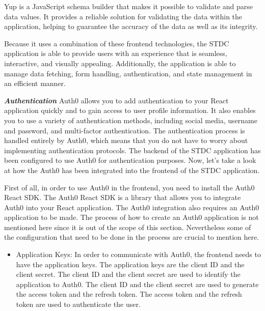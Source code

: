\begin{justify}
        \vspace{0.25cm}
        \newendline Yup is a JavaScript schema builder that makes it possible to validate and parse data values. It provides a reliable solution for validating the data within the application, helping to guarantee the accuracy of the data as well as its integrity.
        
        \vspace{0.25cm}
        \newendline Because it uses a combination of these frontend technologies, the STDC application is able to provide users with an experience that is seamless, interactive, and visually appealing. Additionally, the application is able to manage data fetching, form handling, authentication, and state management in an efficient manner.
    \clearpage





    \vspace{0.25cm}
    \newendline \textbf{\textit{Authentication}}\newendline
        Auth0 allows you to add authentication to your React application quickly and to gain access to user profile information. It also enables you to use a variety of authentication methods, including social media, username and password, and multi-factor authentication. The authentication process is handled entirely by Auth0, which means that you do not have to worry about implementing authentication protocols. The backend of the STDC application has been configured to use Auth0 for authentication purposes. Now, let's take a look at how the Auth0 has been integrated into the frontend of the STDC application.
    
        \vspace{0.25cm}
        \newendline First of all, in order to use Auth0 in the frontend, you need to install the Auth0 React SDK. The Auth0 React SDK is a library that allows you to integrate Auth0 into your React application. The Auth0 integration also requires an Auth0 application to be made. The process of how to create an Auth0 application is not mentioned here since it is out of the scope of this section. Nevertheless some of the configuration that need to be done in the process are crucial to mention here.

        \begin{itemize}
            \item Application Keys: In order to communicate with Auth0, the frontend needs to have the application keys. The application keys are the client ID and the client secret. The client ID and the client secret are used to identify the application to Auth0. The client ID and the client secret are used to generate the access token and the refresh token. The access token and the refresh token are used to authenticate the user.


\end{itemize}
\end{justify}
